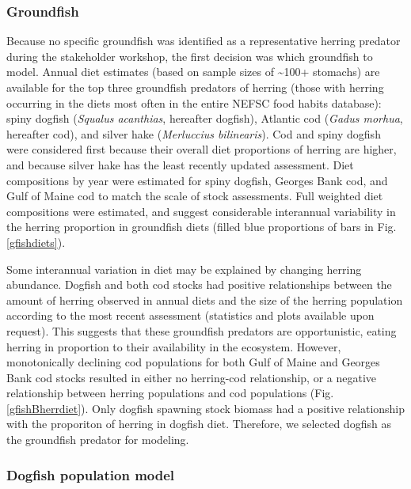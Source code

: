 \documentclass[]{article}
\begin{document}
\subsubsection{Groundfish}\label{groundfish}

Because no specific groundfish was identified as a representative
herring predator during the stakeholder workshop, the first decision was
which groundfish to model. Annual diet estimates (based on sample sizes
of \textasciitilde{}100+ stomachs) are available for the top three
groundfish predators of herring (those with herring occurring in the
diets most often in the entire NEFSC food habits database): spiny
dogfish (\emph{Squalus acanthias}, hereafter dogfish), Atlantic cod
(\emph{Gadus morhua}, hereafter cod), and silver hake (\emph{Merluccius
bilinearis}). Cod and spiny dogfish were considered first because their
overall diet proportions of herring are higher, and because silver hake
has the least recently updated assessment. Diet compositions by year
were estimated for spiny dogfish, Georges Bank cod, and Gulf of Maine
cod to match the scale of stock assessments. Full weighted diet
compositions were estimated, and suggest considerable interannual
variability in the herring proportion in groundfish diets (filled blue
proportions of bars in Fig. \ref{gfishdiets}).

Some interannual variation in diet may be explained by changing herring
abundance. Dogfish and both cod stocks had positive relationships
between the amount of herring observed in annual diets and the size of
the herring population according to the most recent assessment
(statistics and plots available upon request). This suggests that these
groundfish predators are opportunistic, eating herring in proportion to
their availability in the ecosystem. However, monotonically declining
cod populations for both Gulf of Maine and Georges Bank cod stocks
resulted in either no herring-cod relationship, or a negative
relationship between herring populations and cod populations (Fig.
\ref{gfishBherrdiet}). Only dogfish spawning stock biomass had a
positive relationship with the proporiton of herring in dogfish diet.
Therefore, we selected dogfish as the groundfish predator for modeling.

\subsubsection{Dogfish population model}\label{dogfish-population-model}
\end{document}

